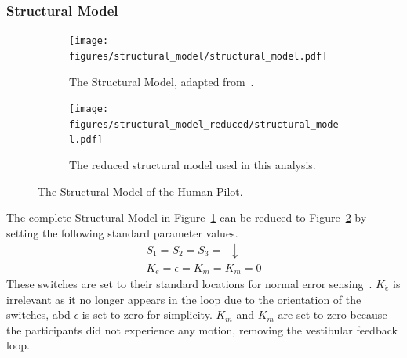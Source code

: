\subsubsection{Structural Model}
\begin{figure}[tb]
    \centering
    \begin{subfigure}{\textwidth}
        \centering
        \texttt{[image: figures/structural\_model/structural\_model.pdf]}
        \caption[The Structural Model]{The Structural Model, adapted from~\citet{hess_unified_1997}.}
        \label{fig:structuralmodel}
    \end{subfigure}
    \hfill
    \begin{subfigure}{\textwidth}
        \centering
        \texttt{[image: figures/structural\_model\_reduced/structural\_model.pdf]}
        \caption[The reduced structural model used in this analysis]{The reduced structural model used in this analysis.}
        \label{fig:structuralmodelreduced}
    \end{subfigure}
    \caption[The Structural Model of the Human Pilot]{The Structural Model of the Human Pilot.}
    \label{fig:structuralmodels}
\end{figure}

The complete Structural Model in Figure~\ref{fig:structuralmodel} can be reduced to Figure~\ref{fig:structuralmodelreduced} by setting the following standard parameter values.
\begin{align}
    \nonumber    S_1 = S_2 = S_3 = \enspace \downarrow \\
    \nonumber    K_{\dot{e}} = \epsilon = K_{\dot{m}} = K_{\ddot{m}} = 0
\end{align}
These switches are set to their standard locations for normal error sensing~\citep{hess_unified_1997}.
$K_{\dot{e}}$ is irrelevant as it no longer appears in the loop due to the orientation of the switches, abd $\epsilon$ is set to zero for simplicity.
$K_{\dot{m}}$ and $K_{\ddot{m}}$ are set to zero because the participants did not experience any motion, removing the vestibular feedback loop.

